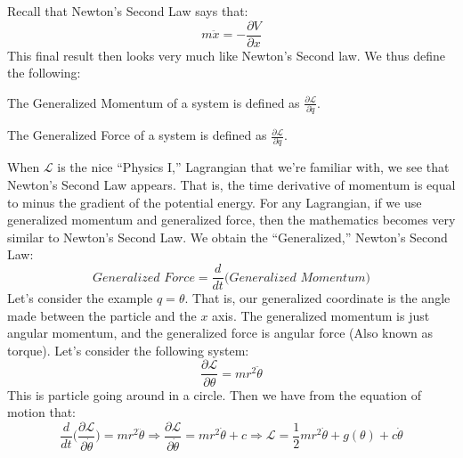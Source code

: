         Recall that Newton's Second Law says that:
        \begin{equation*}
            m\ddot{x}=-\frac{\partial{V}}{\partial{x}}    
        \end{equation*}
        This final result then looks very
        much like Newton's Second law.
        We thus define the following:
        \begin{definition}
            The Generalized Momentum of a system is
            defined as $\frac{\partial\mathcal{L}}{\partial\dot{q}}$.
        \end{definition}
        \begin{definition}
            The Generalized Force of a system is defined as
            $\frac{\partial\mathcal{L}}{\partial q}$.
        \end{definition}
        When $\mathcal{L}$ is the nice ``Physics I,''
        Lagrangian that we're familiar with,
        we see that Newton's Second Law appears.
        That is, the time derivative of momentum is equal
        to minus the gradient of the potential energy.
        For any Lagrangian, if we use generalized momentum
        and generalized force, then the mathematics becomes
        very similar to Newton's Second Law.
        We obtain the ``Generalized,'' Newton's Second Law:
        \begin{equation*}
            \textit{Generalized Force}
            =
            \frac{d}{dt}\big(
                \textit{Generalized Momentum}
            \big)
        \end{equation*}
        Let's consider the example $q=\theta$.
        That is, our generalized coordinate is the angle
        made between the particle and the $x$ axis.
        The generalized momentum is just angular momentum,
        and the generalized force is angular force
        (Also known as torque). Let's consider the
        following system:
        \begin{equation*}
            \frac{\partial\mathcal{L}}{\partial\theta}
            =mr^{2}\ddot{\theta}
        \end{equation*}
        This is particle going around in a circle.
        Then we have from the equation of motion that:
        \begin{equation*}
            \frac{d}{dt}\big(
                \frac{\partial\mathcal{L}}{\partial\dot{\theta}}
            \big)
            =mr^{2}\ddot{\theta}
            \Rightarrow
            \frac{\partial\mathcal{L}}{\partial\dot{\theta}}
            =mr^{2}\dot{\theta}+c
            \Rightarrow
            \mathcal{L}
            =\frac{1}{2}mr^2\dot{\theta}+g(\theta)+c\dot{\theta}
        \end{equation*}
